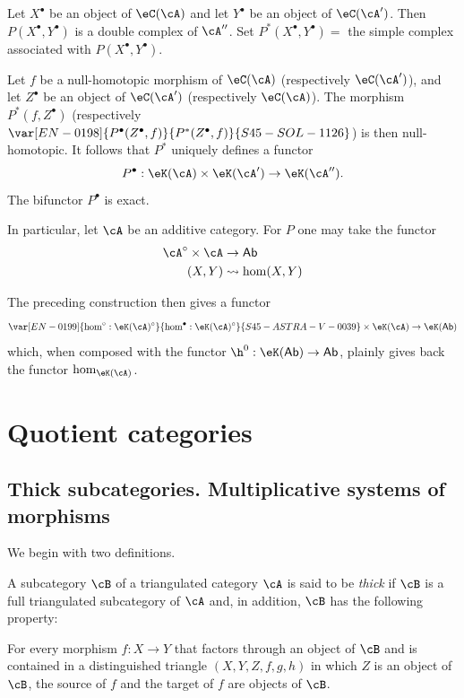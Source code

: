 Let $X^\bullet$ be an object of $\eC(\cA)$ and let $Y^\bullet$ be an
object of $\eC(\cA')$. Then $P(X^\bullet,Y^\bullet)$ is a double complex
of $\cA''$. Set $P^\ast(X^\bullet,Y^\bullet) = $ the simple complex
associated with $P(X^\bullet,Y^\bullet)$.

Let $f$ be a null-homotopic morphism of $\eC(\cA)$ (respectively
$\eC(\cA')$), and let $Z^\bullet$ be an object of $\eC(\cA')$
(respectively $\eC(\cA)$). The morphism $P^\ast(f,Z^\bullet)$
(respectively $\var[EN-0198]{P^\bullet(Z^\bullet,f)}{P^\ast(Z^\bullet,f)}{S45-SOL-1126}$) is then null-homotopic. It follows
that $P^\ast$ uniquely defines a functor
\[
  P^\bullet:\eK(\cA) \times \eK(\cA') \to \eK(\cA'') \text{.}
\]
The bifunctor $P^\bullet$ is exact.

In particular, let $\cA$ be an additive category. For $P$ one may take
the functor
\begin{align*}
  \cA^\circ\times \cA &\to \mathsf{Ab} \\
  (X,Y) &\leadsto \hom(X,Y)
\end{align*}

The preceding construction then gives a functor
\[
  \var[EN-0199]{\hom^\circ:\eK(\cA)^\circ}{\hom^\bullet:\eK(\cA)^\circ}{S45-ASTRA-V-0039} \times \eK(\cA) \to \eK(\mathsf{Ab})
\]
which, when composed with the functor
$\h^0:\eK(\mathsf{Ab})\to \mathsf{Ab}$, plainly gives back the functor
$\hom_{\eK(\cA)}$.

\section{Quotient categories}\label{VIII:2}

\subsection{Thick subcategories. Multiplicative systems of morphisms}\label{VIII:2-1}

We begin with two definitions.

\begin{definition}\label{VIII:2-1-1}
A subcategory $\cB$ of a triangulated category $\cA$ is said to be
\emph{thick} if $\cB$ is a full triangulated subcategory of $\cA$ and,
in addition, $\cB$ has the following property:

For every morphism $f:X\to Y$ that factors through an object of $\cB$ and
is contained in a distinguished triangle $(X,Y,Z,f,g,h)$ in which $Z$ is
an object of $\cB$, the source of $f$ and the target of $f$ are objects of
$\cB$.
\end{definition}

